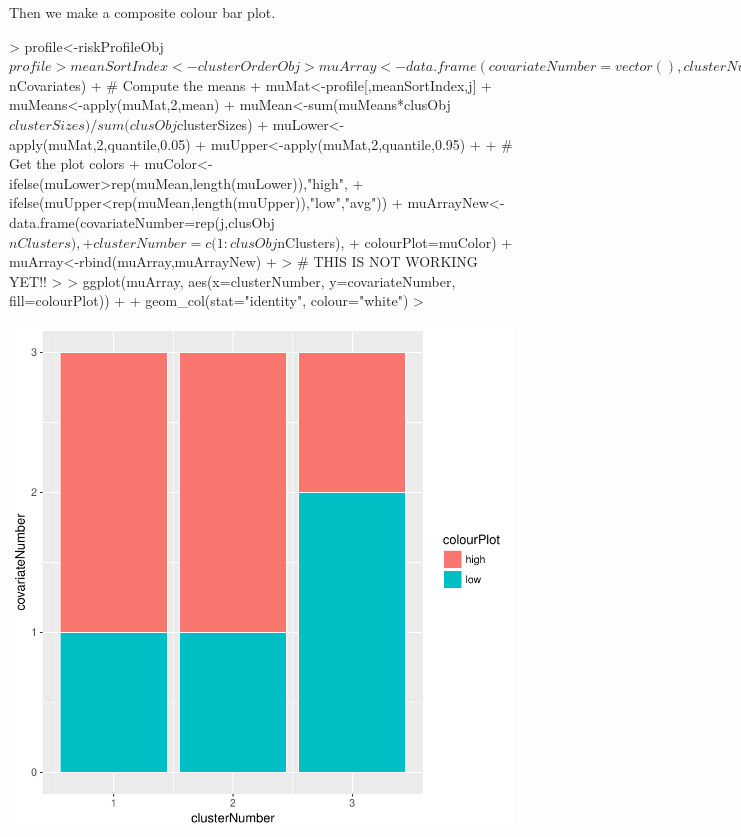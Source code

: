 \documentclass{article}
\begin{document}
Then we make a composite colour bar plot. 
\begin{Schunk}
\begin{Sinput}
> profile<-riskProfileObj$profile
> meanSortIndex<-clusterOrderObj
> muArray<-data.frame(covariateNumber=vector(),clusterNumber=vector(),colourPlot=vector())
> for(j in 1:runInfoObj$nCovariates){
+   # Compute the means
+   muMat<-profile[,meanSortIndex,j]
+   muMeans<-apply(muMat,2,mean)
+   muMean<-sum(muMeans*clusObj$clusterSizes)/sum(clusObj$clusterSizes)
+   muLower<-apply(muMat,2,quantile,0.05)
+   muUpper<-apply(muMat,2,quantile,0.95)
+ 
+     # Get the plot colors
+   muColor<-ifelse(muLower>rep(muMean,length(muLower)),"high",
+                 ifelse(muUpper<rep(muMean,length(muUpper)),"low","avg"))
+   muArrayNew<-data.frame(covariateNumber=rep(j,clusObj$nClusters),
+                          clusterNumber=c(1:clusObj$nClusters),
+                          colourPlot=muColor)
+   muArray<-rbind(muArray,muArrayNew)  
+ }
> # THIS IS NOT WORKING YET!!
> 
> ggplot(muArray, aes(x=clusterNumber, y=covariateNumber, fill=colourPlot)) +
+   geom_col(stat="identity", colour="white") 
> 
\end{Sinput}
\end{Schunk}
\includegraphics{Fig-test1}

\end{document}
